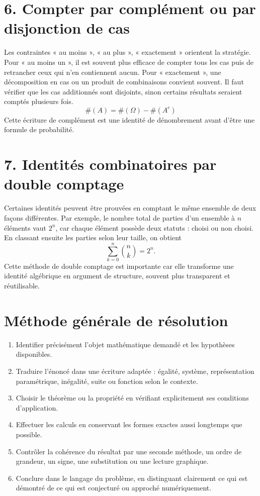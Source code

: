 
\section{6. Compter par complément ou par disjonction de cas}
Les contraintes « au moins », « au plus », « exactement » orientent la stratégie. Pour « au moins un », il est souvent plus efficace de compter tous les cas puis de retrancher ceux qui n'en contiennent aucun. Pour « exactement », une décomposition en cas ou un produit de combinaisons convient souvent. Il faut vérifier que les cas additionnés sont disjoints, sinon certains résultats seraient comptés plusieurs fois.
\[
\#(A)=\#(\Omega)-\#(A^c)
\]
Cette écriture de complément est une identité de dénombrement avant d'être une formule de probabilité.

\section{7. Identités combinatoires par double comptage}
Certaines identités peuvent être prouvées en comptant le même ensemble de deux façons différentes. Par exemple, le nombre total de parties d'un ensemble à $n$ éléments vaut $2^n$, car chaque élément possède deux statuts : choisi ou non choisi. En classant ensuite les parties selon leur taille, on obtient
\[
\sum_{k=0}^{n}\binom{n}{k}=2^n.
\]
Cette méthode de double comptage est importante car elle transforme une identité algébrique en argument de structure, souvent plus transparent et réutilisable.


\section{Méthode générale de résolution}
\begin{methode}
\begin{enumerate}
\item Identifier précisément l'objet mathématique demandé et les hypothèses disponibles.
\item Traduire l'énoncé dans une écriture adaptée : égalité, système, représentation paramétrique, inégalité, suite ou fonction selon le contexte.
\item Choisir le théorème ou la propriété en vérifiant explicitement ses conditions d'application.
\item Effectuer les calculs en conservant les formes exactes aussi longtemps que possible.
\item Contrôler la cohérence du résultat par une seconde méthode, un ordre de grandeur, un signe, une substitution ou une lecture graphique.
\item Conclure dans le langage du problème, en distinguant clairement ce qui est démontré de ce qui est conjecturé ou approché numériquement.
\end{enumerate}
\end{methode}

